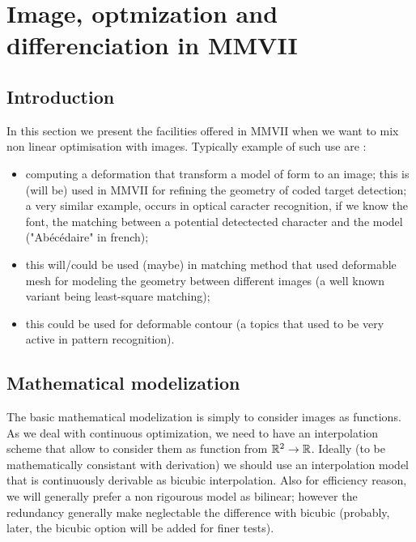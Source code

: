\section{Image, optmization and differenciation in MMVII}

\subsection{Introduction}

In this section we present the facilities offered in MMVII when we want to mix non
linear optimisation with images. Typically example of such use are :

\begin{itemize}
     \item computing a deformation that transform a model of form  to an image;
           this is (will be) used  in MMVII for refining the  geometry of coded target detection;
           a very similar example, occurs in optical caracter recognition, if we know the font,
           the matching between a potential detectected character and the model ("Ab\'ec\'edaire" in french);

      \item this will/could be used (maybe) in matching method that used deformable mesh for modeling
            the geometry between different images (a well known variant being least-square matching);

      \item this could be used for deformable contour (a topics that used to be very active in 
            pattern recognition).
\end{itemize}

\subsection{Mathematical modelization}

The basic mathematical modelization is simply to consider images as functions.
As we deal with  continuous optimization, we need to have an interpolation scheme that
allow to consider them as function from $\mathbb{R}^2 \rightarrow \mathbb{R}$.
Ideally (to be mathematically consistant with derivation) we should use an interpolation 
model that is continuously derivable as bicubic interpolation. Also for efficiency reason,
we will generally prefer a non rigourous model as bilinear;  however the redundancy generally make
neglectable the difference with bicubic (probably, later, the bicubic option will be added for finer
tests).

